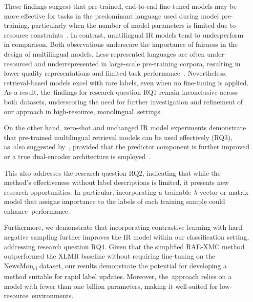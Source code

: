 \documentclass[make,article,accept,pdftex,moreauthors]{Definitions/mdpi}
\begin{document}
These findings suggest that pre-trained, end-to-end fine-tuned models may be more effective for tasks in the predominant language used during model pre-training, particularly when the number of model parameters is limited due to resource constraints~\citep{chang2023multilingualitycurselanguagemodeling}.
In contrast, multilingual IR models tend to underperform in comparison. 
Both observations underscore the importance of fairness in the design of multilingual models.
Less-represented languages are often under-resourced and underrepresented in large-scale pre-training corpora, resulting in lower quality representations and limited task performance~\citep{gupta2025multilingualperformancebiaseslarge}.
Nevertheless, retrieval-based models excel with rare labels, even when no fine-tuning is applied.
As a result, the~findings for research question RQ1 remain inconclusive across both datasets, underscoring the need for further investigation and refinement of our approach in high-resource, monolingual~settings.

On the other hand, zero-shot and unchanged IR model experiments demonstrate that pre-trained multilingual retrieval models can be used effectively (RQ3), as~also suggested by~\citep{wang2025retrievalaugmentedencodersextrememultilabel}, provided that the predictor component is further improved or a true dual-encoder architecture is employed~\citep{gupta2024dexml}.

This also addresses the research question RQ2, indicating that while the method's effectiveness without label descriptions is limited, it presents new research opportunities. 
In particular, incorporating a trainable $\lambda$ vector or matrix model that assigns importance to the labels of each training sample could enhance~performance.

Furthermore, we demonstrate that incorporating contrastive learning with hard negative sampling further improves the IR model within our classification setting, addressing research question RQ4.
Given that the simplified RAE-XMC method outperformed the XLMR baseline without requiring fine-tuning on the NewsMon\textsubscript{sl} dataset, our results demonstrate the potential for developing a method suitable for rapid label updates. Moreover, the~approach relies on a model with fewer than one billion parameters, making it well-suited for low-resource~environments. 
\end{document}
